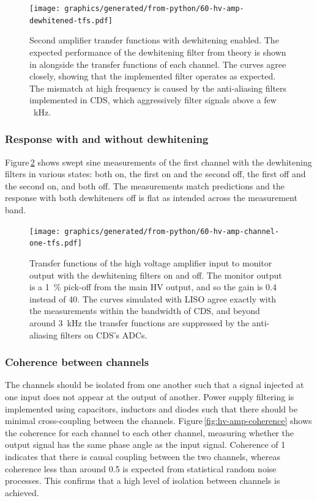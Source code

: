\begin{figure}
  \centering
  \texttt{[image: graphics/generated/from-python/60-hv-amp-dewhitened-tfs.pdf]}
  \caption[Frequency response of the high voltage amplifier's channels with dewhitening enabled]{Second amplifier transfer functions with dewhitening enabled. The expected performance of the dewhitening filter from theory is shown in  alongside the transfer functions of each channel. The curves agree closely, showing that the implemented filter operates as expected. The mismatch at high frequency is caused by the anti-aliasing filters implemented in \gls{CDS}, which aggressively filter signals above a few \SI{}{\kilo\hertz}.}
  \label{fig:hv-amp-dewhitened-tfs}
\end{figure}

\subsubsection{Response with and without dewhitening}
Figure\,\ref{fig:hv-amp-channel-one-tfs} shows swept sine measurements of the first channel with the dewhitening filters in various states: both on, the first on and the second off, the first off and the second on, and both off. The measurements match predictions and the response with both dewhiteners off is flat as intended across the measurement band.

\begin{figure}
  \centering
  \texttt{[image: graphics/generated/from-python/60-hv-amp-channel-one-tfs.pdf]}
  \caption[Transfer functions of the high voltage amplifier input to monitor output with the dewhiteners on and off]{Transfer functions of the high voltage amplifier input to monitor output with the dewhitening filters on and off. The monitor output is a \SI{1}{\percent} pick-off from the main \gls{HV} output, and so the gain is \num{0.4} instead of \num{40}. The curves simulated with \gls{LISO} agree exactly with the measurements within the bandwidth of \gls{CDS}, and beyond around \SI{3}{\kilo\hertz} the transfer functions are suppressed by the anti-aliasing filters on \gls{CDS}'s \glspl{ADC}.}
  \label{fig:hv-amp-channel-one-tfs}
\end{figure}

\subsubsection{Coherence between channels}
The channels should be isolated from one another such that a signal injected at one input does not appear at the output of another. Power supply filtering is implemented using capacitors, inductors and diodes such that there should be minimal cross-coupling between the channels. Figure\,\ref{fig:hv-amp-coherence} shows the coherence for each channel to each other channel, measuring whether the output signal has the same phase angle as the input signal. Coherence of \num{1} indicates that there is causal coupling between the two channels, whereas coherence less than around \num{0.5} is expected from statistical random noise processes. This confirms that a high level of isolation between channels is achieved.

